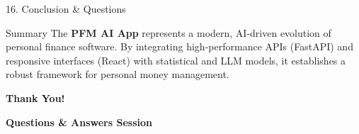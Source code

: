 \documentclass[10pt,aspectratio=169]{beamer}
\begin{document}
\begin{frame}{16. Conclusion \& Questions}
    \begin{block}{Summary}
        The \textbf{PFM AI App} represents a modern, AI-driven evolution of personal finance software. By integrating high-performance APIs (FastAPI) and responsive interfaces (React) with statistical and LLM models, it establishes a robust framework for personal money management.
    \end{block}
    
    \centering
    \vspace{0.8cm}
    {\large \textbf{Thank You!}}
    
    \vspace{0.4cm}
    \textbf{Questions \& Answers Session}
\end{frame}
\end{document}
